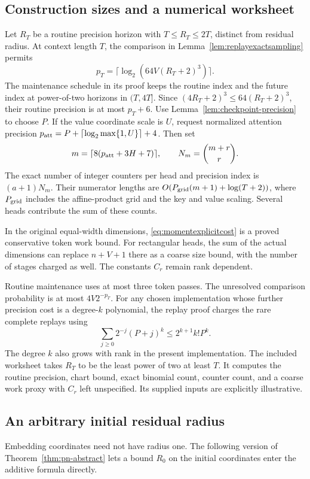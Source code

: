 \subsection{Construction sizes and a numerical worksheet}

Let $R_T$ be a routine precision horizon with $T\le R_T\le2T$,
distinct from residual radius. At context length $T$, the comparison
in Lemma~\ref{lem:replayexactsampling} permits
\[
 p_T=\lceil\log_2(64V(R_T+2)^3)\rceil.
\]
The maintenance schedule in its proof keeps the routine index and the
future index at power-of-two horizons in $(T,4T]$. Since
$(4R_T+2)^3\le64(R_T+2)^3$, their routine precision is at most
$p_T+6$.
Use Lemma~\ref{lem:checkpoint-precision} to choose $P$.
If the value coordinate scale is $U$, request normalized
attention precision
$p_{\rm att}=P+\lceil\log_2\max\{1,U\}\rceil+4$.
Then set
\[
 m=\lceil8(p_{\rm att}+3H+7)\rceil,\qquad
 N_m=\binom{m+r}{r}.
\]
The exact number of integer counters per head and precision
index is $(a+1)N_m$. Their numerator lengths are
$O(P_{\rm grid}(m+1)+\log(T+2))$, where $P_{\rm grid}$ includes
the affine-product grid and the key and value scaling.
Several heads contribute the sum of these counts.

In the original equal-width dimensions,
\eqref{eq:momentexplicitcost} is a proved conservative token work
bound. For rectangular heads, the sum of the actual dimensions can
replace $n+V+1$ there as a coarse size bound, with the number of
stages charged as well. The constants $C_r$ remain rank dependent.

Routine maintenance uses at most three token passes. The
unresolved comparison probability is at most $4V2^{-p_T}$.
For any chosen implementation whose further precision cost is a
degree-$k$ polynomial, the replay proof charges the rare complete
replays using
\[
 \sum_{j\ge0}2^{-j}(P+j)^k
       \le2^{k+1}k!P^k.
\]
The degree $k$ also grows with rank in the present implementation.
The included worksheet takes $R_T$ to be the least power of two at
least $T$. It computes the routine precision, chart
bound, exact binomial count, counter count, and a coarse work
proxy with $C_r$ left unspecified. Its supplied inputs are
explicitly illustrative.

\subsection{An arbitrary initial residual radius}

Embedding coordinates need not have radius one. The following version
of Theorem~\ref{thm:pn-abstract} lets a bound $R_0$ on the initial
coordinates enter the additive formula directly.

